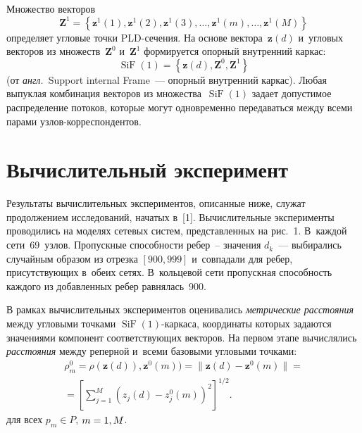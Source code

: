\begin{multicols}{2}
\begin{figure*}[b]
\begin{center}
\end{center}
\vspace*{-9pt}
\end{figure*}

Множество векторов
$$
\mathbf{Z}^{1}=\left\{\mathbf{z}^{1}(1), \mathbf{z}^{1}(2),
\mathbf{z}^{1}(3),\dots, \mathbf{z}^{1}(m),\dots,
\mathbf{z}^{1}(M)\right\}
$$ 
определяет угловые точ\-ки PLD-се\-че\-ния. На
основе вектора~$\mathbf{z}(d)$ и~угловых век\-то\-ров из множеств~$\mathbf{Z}^{0}$ 
и~$\mathbf{Z}^{1}$ формируется опор\-ный внут\-рен\-ний каркас:
$$
\operatorname{SiF}(1)=\left\{\mathbf{z}(d),
\mathbf{Z}^{0},\mathbf{Z}^{1}\right\}
$$ 
(от \textit{англ.}\ Support internal
Frame~--- опорный внут\-рен\-ний каркас). Любая вы\-пук\-лая комбинация
век\-то\-ров из множества~$\operatorname{SiF}(1)$ задает до\-пус\-ти\-мое
распределение потоков, которые могут одновременно передаваться
меж\-ду всеми парами уз\-лов-кор\-рес\-пон\-ден\-тов.

\section{Вычислительный эксперимент}

Результаты вычислительных экспериментов, описанные ниже, служат
продолжением исследований, начатых в~[1]. Вы\-чис\-ли\-тель\-ные
эксперименты проводились на моделях сетевых сис\-тем, пред\-став\-лен\-ных
на рис.~1. В~каждой
сети~69~узлов. Про\-пуск\-ные способности ребер~-- значения $d_k$~---
выбирались случайным образом из от\-рез\-ка $[900,999]$ и~совпадали
для ребер, при\-сут\-ст\-ву\-ющих в~обеих сетях. В~кольцевой сети
про\-пуск\-ная спо\-соб\-ность каж\-до\-го из до\-бав\-лен\-ных ребер рав\-ня\-лась~900.



В рамках вычислительных экспериментов оценивались
\textit{мет\-ри\-че\-ские рас\-сто\-яния}   меж\-ду угловыми точками
$\operatorname{SiF}(1)$-каркаса, координаты которых задаются
значениями компонент со\-от\-вет\-ст\-ву\-ющих век\-то\-ров. На первом этапе
вы\-чис\-ля\-лись \textit{рас\-сто\-яния} между реперной и~всеми базовыми
угловыми точ\-ками:
\begin{multline*}
\rho_m^0=\rho(\mathbf{z}(d)), \mathbf z^0(m))= \|\mathbf
z(d)-\mathbf{z}^0(m)\|={}\\
{}=
\left[\sum\limits_{j=1}^M\left(z_j(d)-z_j^0(m)\right)^2\right]^{1/2}.
\end{multline*}
для всех $p_m\in P$, $m\hm=1,M$.






\end{multicols}
